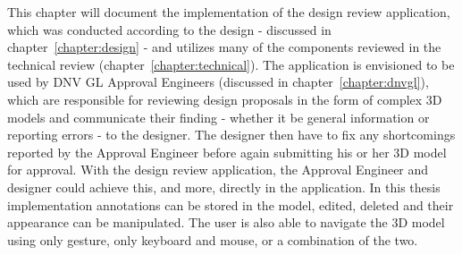 % 
% 
% 



This chapter will document the implementation of the design review application, which was conducted according to the design - discussed in chapter~\ref{chapter:design} - 
and utilizes many of the components reviewed in the technical review (chapter~\ref{chapter:technical}). The application is envisioned to be used by DNV GL Approval Engineers 
(discussed in chapter~\ref{chapter:dnvgl}), which are responsible for reviewing design proposals in the form of complex 3D models and communicate their finding - whether it 
be general information or reporting errors - to the designer. The designer then have to fix any shortcomings reported by the Approval Engineer before again submitting 
his or her 3D model for approval. With the design review application, the Approval Engineer and designer could achieve this, and more, directly in the application.
In this thesis implementation annotations can be stored in the model, edited, deleted and their appearance can be manipulated. The user is also able to navigate the 
3D model using only gesture, only keyboard and mouse, or a combination of the two.

